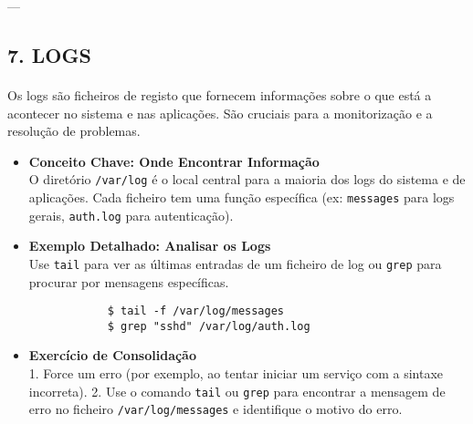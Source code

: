 \documentclass[10pt,a4paper]{article}
\begin{document}
	---
	
	\subsection*{7. LOGS}
	\vspace{-1.2em}
	\paragraph{}
	Os logs são ficheiros de registo que fornecem informações sobre o que está a acontecer no sistema e nas aplicações. São cruciais para a monitorização e a resolução de problemas.
	
	\begin{itemize}
		\item \textbf{Conceito Chave: Onde Encontrar Informação} \\
		O diretório \texttt{/var/log} é o local central para a maioria dos logs do sistema e de aplicações. Cada ficheiro tem uma função específica (ex: \texttt{messages} para logs gerais, \texttt{auth.log} para autenticação).
		
		\item \textbf{Exemplo Detalhado: Analisar os Logs} \\
		Use \texttt{tail} para ver as últimas entradas de um ficheiro de log ou \texttt{grep} para procurar por mensagens específicas.
		\begin{verbatim}
			$ tail -f /var/log/messages
			$ grep "sshd" /var/log/auth.log
		\end{verbatim}
		
		\item \textbf{Exercício de Consolidação} \\
		1. Force um erro (por exemplo, ao tentar iniciar um serviço com a sintaxe incorreta).
		2. Use o comando \texttt{tail} ou \texttt{grep} para encontrar a mensagem de erro no ficheiro \texttt{/var/log/messages} e identifique o motivo do erro.
	\end{itemize}
	
\end{document}
